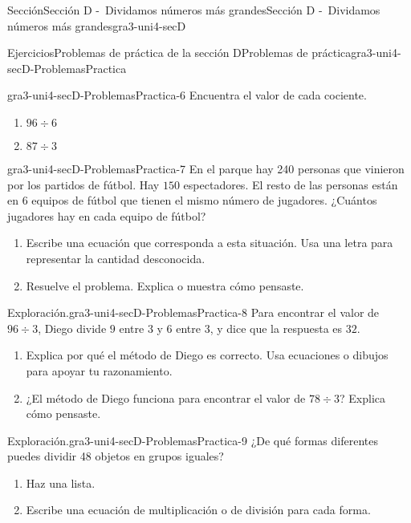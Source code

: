 \documentclass[twoside,14pt,]{extarticle}
\begin{document}
\begin{sectionptx}{Sección}{Sección D -~Dividamos números más grandes}{}{Sección D -~Dividamos números más grandes}{}{}{gra3-uni4-secD}
\begin{exercises-subsection}{Ejercicios}{Problemas de práctica de la sección D}{}{Problemas de práctica}{}{}{gra3-uni4-secD-ProblemasPractica}
\begin{divisionexercise}{4}{}{}{gra3-uni4-secD-ProblemasPractica-6}%
Encuentra el valor de cada cociente.%
%
\begin{enumerate}[label=(\alph*)]
\item{}\(\displaystyle 96 \div 6\)%
\item{}\(\displaystyle 87 \div 3\)%
\end{enumerate}
\end{divisionexercise}%
\begin{divisionexercise}{5}{}{}{gra3-uni4-secD-ProblemasPractica-7}%
En el parque hay 240 personas que vinieron por los partidos de fútbol. Hay \(150\) espectadores. El resto de las personas están en \(6\) equipos de fútbol que tienen el mismo número de jugadores. ¿Cuántos jugadores hay en cada equipo de fútbol?%
%
\begin{enumerate}[label=(\alph*)]
\item{}Escribe una ecuación que corresponda a esta situación. Usa una letra para representar la cantidad desconocida.%
\item{}Resuelve el problema. Explica o muestra cómo pensaste.%
\end{enumerate}
\end{divisionexercise}%
\begin{divisionexercise}{6}{Exploración.}{}{gra3-uni4-secD-ProblemasPractica-8}%
Para encontrar el valor de \(96 \div 3\), Diego divide \(9\) entre \(3\) y \(6\) entre \(3\), y dice que la respuesta es \(32\).%
%
\begin{enumerate}[label=(\alph*)]
\item{}Explica por qué el método de Diego es correcto. Usa ecuaciones o dibujos para apoyar tu razonamiento.%
\item{}¿El método de Diego funciona para encontrar el valor de \(78 \div 3\)?%
 Explica cómo pensaste.\end{enumerate}
\end{divisionexercise}%
\begin{divisionexercise}{7}{Exploración.}{}{gra3-uni4-secD-ProblemasPractica-9}%
¿De qué formas diferentes puedes dividir 48 objetos en grupos iguales?%
%
\begin{enumerate}[label=(\alph*)]
\item{}Haz una lista.%
\item{}Escribe una ecuación de multiplicación o de división para cada forma.%
\end{enumerate}
\end{divisionexercise}%

\end{exercises-subsection}
\end{sectionptx}
\end{document}
